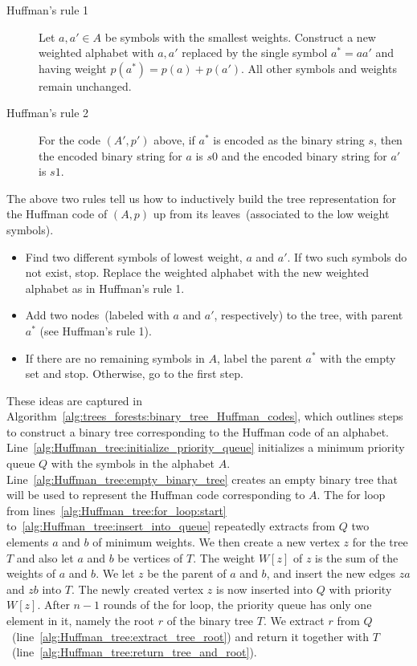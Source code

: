 \begin{description}
\item[Huffman's rule 1] Let $a,a' \in A$ be symbols with the smallest
  weights. Construct a new weighted alphabet with $a,a'$ replaced by
  the single symbol $a^* = aa'$ and having weight
  $p(a^*) = p(a) + p(a')$. All other symbols and weights remain
  unchanged.

\item[Huffman's rule 2] For the code $(A',p')$ above, if $a^*$ is
  encoded as the binary string $s$, then the encoded binary string for
  $a$ is $s0$ and the encoded binary string for $a'$ is $s1$.
\end{description}

The above two rules tell us how to inductively build the tree
representation for the Huffman code of $(A,p)$ up from its
leaves~(associated to the low weight symbols).
%
\begin{itemize}
\item Find two different symbols of lowest weight, $a$ and $a'$. If
  two such symbols do not exist, stop. Replace the weighted alphabet
  with the new weighted alphabet as in Huffman's rule 1.

\item Add two nodes~(labeled with $a$ and $a'$, respectively) to the
  tree, with parent $a^*$ (see Huffman's rule 1).

\item If there are no remaining symbols in $A$, label the parent $a^*$
  with the empty set and stop. Otherwise, go to the first step.
\end{itemize}

These ideas are captured in
Algorithm~\ref{alg:trees_forests:binary_tree_Huffman_codes}, which
outlines steps to construct a binary tree corresponding to the Huffman
code of an alphabet.
Line~\ref{alg:Huffman_tree:initialize_priority_queue} initializes a
minimum priority queue $Q$ with the symbols in the alphabet $A$.
Line~\ref{alg:Huffman_tree:empty_binary_tree} creates an empty binary
tree that will be used to represent the Huffman code corresponding to
$A$. The for loop from lines~\ref{alg:Huffman_tree:for_loop:start}
to~\ref{alg:Huffman_tree:insert_into_queue} repeatedly extracts from
$Q$ two elements $a$ and $b$ of minimum weights. We then create a new
vertex $z$ for the tree $T$ and also let $a$ and $b$ be vertices of
$T$. The weight $W[z]$ of $z$ is the sum of the weights of $a$ and
$b$. We let $z$ be the parent of $a$ and $b$, and insert the new edges
$za$ and $zb$ into $T$. The newly created vertex $z$ is now inserted
into $Q$ with priority $W[z]$. After $n - 1$ rounds of the for loop,
the priority queue has only one element in it, namely the root $r$ of
the binary tree $T$. We extract $r$ from
$Q$~(line~\ref{alg:Huffman_tree:extract_tree_root}) and return it
together with $T$~(line~\ref{alg:Huffman_tree:return_tree_and_root}).

